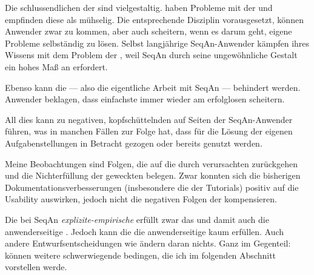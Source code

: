 Die schlussendlichen  der  sind vielgestaltig.  haben Probleme mit der  und empfinden diese als mühselig. Die entsprechende Disziplin vorausgesetzt, können Anwender zwar zu  kommen, aber auch scheitern, wenn es darum geht, eigene Probleme selbständig zu lösen. Selbst langjährige SeqAn-Anwender kämpfen ihres Wissens mit dem Problem der , weil SeqAn durch seine ungewöhnliche Gestalt ein hohes Maß an  erfordert.

Ebenso kann die  --- also die eigentliche Arbeit mit SeqAn --- behindert werden. Anwender beklagen, dass einfachste  immer wieder am erfolglosen  scheitern.

All dies kann zu negativen, kopfschüttelnden  auf Seiten der SeqAn-Anwender führen, was in manchen Fällen zur Folge hat, dass  für die Lösung der eigenen Aufgabenstellungen in Betracht gezogen oder bereits genutzt werden.

Meine Beobachtungen sind Folgen, die auf die durch  verursachten  zurückgehen und die Nichterfüllung der geweckten  belegen. Zwar konnten sich die bisherigen Dokumentationsverbesserungen (insbesondere die der Tutorials) positiv auf die Usability auswirken, jedoch nicht die negativen Folgen der  kompensieren.

Die bei SeqAn \textit{explizite-empirische}   erfüllt zwar das   und damit auch die anwenderseitige . Jedoch kann die  die anwenderseitige  kaum erfüllen. Auch andere Entwurfsentscheidungen wie   ändern daran nichts. Ganz im Gegenteil:  können weitere schwerwiegende  bedingen, die ich im folgenden Abschnitt vorstellen werde.



